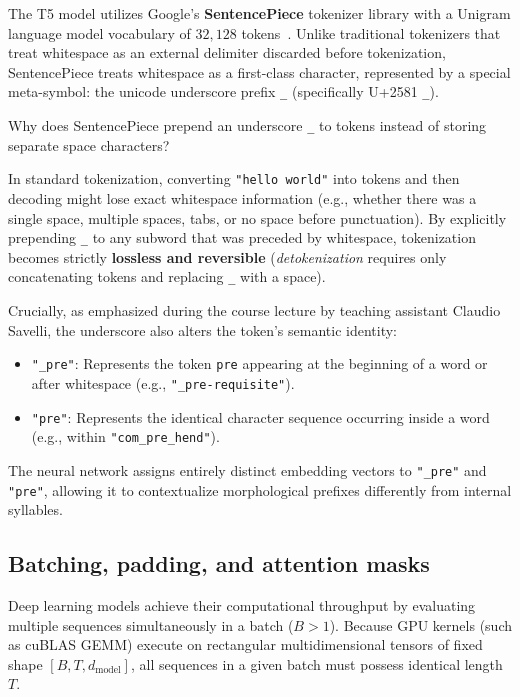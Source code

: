 \documentclass[../labs.tex]{subfiles}
\begin{document}
The T5 model utilizes Google's \textbf{SentencePiece} tokenizer library with a Unigram language model vocabulary of $32{,}128$ tokens~\cite{kudo2018,raffel2020t5}. Unlike traditional tokenizers that treat whitespace as an external delimiter discarded before tokenization, SentencePiece treats whitespace as a first-class character, represented by a special meta-symbol: the unicode underscore prefix \texttt{\_} (specifically U+2581 \texttt{\_}).

\begin{intuition}
Why does SentencePiece prepend an underscore \texttt{\_} to tokens instead of storing separate space characters?

In standard tokenization, converting \texttt{"hello world"} into tokens and then decoding might lose exact whitespace information (e.g., whether there was a single space, multiple spaces, tabs, or no space before punctuation). By explicitly prepending \texttt{\_} to any subword that was preceded by whitespace, tokenization becomes strictly \textbf{lossless and reversible} (\textit{detokenization} requires only concatenating tokens and replacing \texttt{\_} with a space). 

Crucially, as emphasized during the course lecture by teaching assistant Claudio Savelli, the underscore also alters the token's semantic identity:
\begin{itemize}
    \item \texttt{"\_pre"}: Represents the token \texttt{pre} appearing at the beginning of a word or after whitespace (e.g., \texttt{"\_pre-requisite"}).
    \item \texttt{"pre"}: Represents the identical character sequence occurring inside a word (e.g., within \texttt{"com\_pre\_hend"}).
\end{itemize}
The neural network assigns entirely distinct embedding vectors to \texttt{"\_pre"} and \texttt{"pre"}, allowing it to contextualize morphological prefixes differently from internal syllables.
\end{intuition}

\subsection{Batching, padding, and attention masks}

Deep learning models achieve their computational throughput by evaluating multiple sequences simultaneously in a batch ($B > 1$). Because GPU kernels (such as cuBLAS GEMM) execute on rectangular multidimensional tensors of fixed shape $[B, T, d_{\text{model}}]$, all sequences in a given batch must possess identical length $T$.
\end{document}
